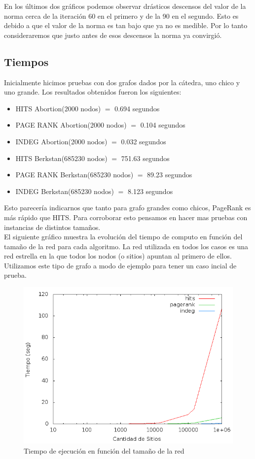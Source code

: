 En los últimos dos gráficos podemos observar drásticos descensos del valor de la norma cerca de la iteración 60 en el primero y de la 90 en el segundo. Esto es debido a que el valor de la norma es tan bajo que ya no es medible. Por lo tanto consideraremos que justo antes de esos descensos la norma ya convirgió.

\clearpage

\subsection{Tiempos}
Inicialmente hicimos pruebas con dos grafos dados por la cátedra, uno chico y uno grande. Los resultados obtenidos fueron los siguientes:
\begin{itemize}
\item{HITS Abortion(2000 nodos) $=$ 0.694 segundos }
\item{PAGE RANK Abortion(2000 nodos) $=$ 0.104 segundos }
\item{INDEG Abortion(2000 nodos) $=$ 0.032 segundos }
\item{HITS Berkstan(685230 nodos) $=$ 751.63 segundos }
\item{PAGE RANK Berkstan(685230 nodos) $=$ 89.23 segundos }
\item{INDEG Berkstan(685230 nodos) $=$ 8.123 segundos }
\end{itemize}

Esto parecería indicarnos que tanto para grafo grandes como chicos, PageRank es más rápido que HITS. Para corroborar esto pensamos en hacer mas pruebas con instancias de distintos tamaños.\\
El siguiente gráfico muestra la evolución del tiempo de computo en función del tamaño de la red para cada algoritmo. La red utilizada en todos los casos es una red estrella en la que todos los nodos (o sitios) apuntan al primero de ellos. Utilizamos este tipo de grafo a modo de ejemplo para tener un caso incial de prueba.
 \begin{figure}[!htb]
 \begin{center}
    \includegraphics[scale=0.5]{imagenes/Tiempos.png}
    \caption{Tiempo de ejecución en función del tamaño de la red}
    \end{center}
 \end{figure}

